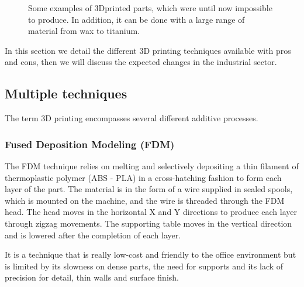 \begin{figure}[!b]
\centering
    \hfil
    \hfil
    \caption{Some examples of 3Dprinted parts, which were until now impossible to produce. In addition, it can be done with a large range of material from wax to titanium.}
    \label{fig:3D_printed_objects}
\end{figure}

In this section we detail the different 3D printing techniques available with pros and cons, then we will discuss the expected changes in the industrial sector.

\subsection{Multiple techniques} %

The term 3D printing encompasses several different additive processes.

\subsubsection{Fused Deposition Modeling (FDM)} %

The FDM technique relies on melting and selectively depositing a thin filament of thermoplastic polymer (ABS - PLA) in a cross-hatching fashion to form each layer of the part. The material is in the form of a wire supplied in sealed spools, which is mounted on the machine, and the wire is threaded through the FDM head. The head moves in the horizontal X and Y directions  to produce each layer through zigzag movements. The supporting table moves in the vertical direction and is lowered after the completion of each layer.

\begin{figure}[ht]
    \centering
        \hfil
        \hfil
    \caption{}
    \label{fig:FDM_technique}
\end{figure}

It is a technique that is really low-cost and friendly to the office environment but is limited by its slowness on dense parts, the need for supports and its lack of precision for detail, thin walls and surface finish.


